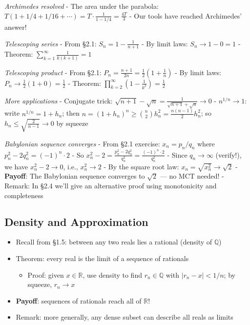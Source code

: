 \documentclass[
  10pt,
  letterpaper,
]{scrbook}
\providecommand{\tightlist}{%
  \setlength{\itemsep}{0pt}\setlength{\parskip}{0pt}}
\newcommand{\QQ}{\mathbb{Q}}
\newcommand{\RR}{\mathbb{R}}
\begin{document}
\emph{Archimedes resolved} - The area under the parabola:
\(T(1 + 1/4 + 1/16 + \cdots) = T \cdot \frac{1}{1-1/4} = \frac{4T}{3}\)
- Our tools have reached Archimedes' answer!

\emph{Telescoping series} - From §2.1: \(S_n = 1 - \frac{1}{n+1}\) - By
limit laws: \(S_n \to 1 - 0 = 1\) - Theorem:
\(\sum_{k=1}^{\infty} \frac{1}{k(k+1)} = 1\)

\emph{Telescoping product} - From §2.1:
\(P_n = \frac{n+1}{2n} = \frac{1}{2}(1 + \frac{1}{n})\) - By limit laws:
\(P_n \to \frac{1}{2}(1 + 0) = \frac{1}{2}\) - Theorem:
\(\prod_{k=2}^{\infty}(1 - \frac{1}{k^2}) = \frac{1}{2}\)

\emph{More applications} - Conjugate trick:
\(\sqrt{n+1} - \sqrt{n} = \frac{1}{\sqrt{n+1} + \sqrt{n}} \to 0\) -
\(n^{1/n} \to 1\): write \(n^{1/n} = 1 + h_n\); then
\(n = (1+h_n)^n \geq \binom{n}{2}h_n^2 = \frac{n(n-1)}{2}h_n^2\); so
\(h_n \leq \sqrt{\frac{2}{n-1}} \to 0\) by squeeze

\emph{Babylonian sequence converges} - From §2.1 exercise:
\(x_n = p_n/q_n\) where \(p_n^2 - 2q_n^2 = (-1)^n \cdot 2\) - So
\(x_n^2 - 2 = \frac{p_n^2 - 2q_n^2}{q_n^2} = \frac{(-1)^n \cdot 2}{q_n^2}\)
- Since \(q_n \to \infty\) (verify!), we have \(x_n^2 - 2 \to 0\), i.e.,
\(x_n^2 \to 2\) - By the square root law:
\(x_n = \sqrt{x_n^2} \to \sqrt{2}\) - \textbf{Payoff}: The Babylonian
sequence converges to \(\sqrt{2}\) --- no MCT needed! - Remark: In §2.4
we'll give an alternative proof using monotonicity and completeness

\subsection{Density and Approximation}\label{density-and-approximation}

\begin{itemize}
\tightlist
\item
  Recall from §1.5: between any two reals lies a rational (density of
  \(\QQ\))
\item
  Theorem: every real is the limit of a sequence of rationals

  \begin{itemize}
  \tightlist
  \item
    Proof: given \(x \in \RR\), use density to find \(r_n \in \QQ\) with
    \(|r_n - x| < 1/n\); by squeeze, \(r_n \to x\)
  \end{itemize}
\item
  \textbf{Payoff}: sequences of rationals reach all of \(\RR\)!
\item
  Remark: more generally, any dense subset can describe all reals as
  limits
\end{itemize}
\end{document}
